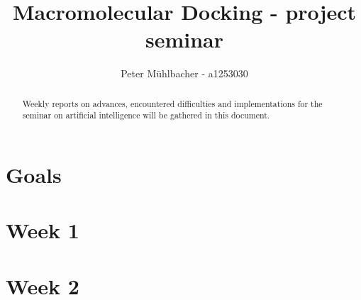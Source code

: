 \documentclass[12pt]{article}
\title{Macromolecular Docking - project seminar}
\author{Peter M\"uhlbacher - a1253030}
\theoremstyle{definition}\newtheorem*{definition}{Definition}
\theoremstyle{definition}\newtheorem*{remark}{Remark}
\begin{document}
\maketitle
\tableofcontents

\begin{abstract}
Weekly reports on advances, encountered difficulties and implementations for the seminar on artificial intelligence will be gathered in this document.
\end{abstract}

\section*{Goals}


\section{Week 1}


\section{Week 2}




\end{document}
